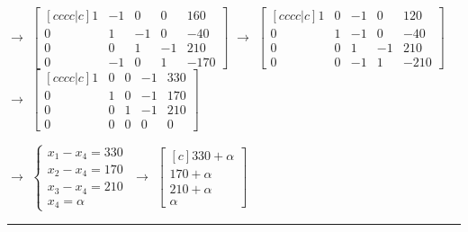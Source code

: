 \begin{example}
$\rightarrow$
$  \begin{bmatrix} [cccc|c]
1 & -1 & 0 & 0 & 160 \\
0 & 1 & -1 & 0 & -40 \\
0 & 0 & 1 & -1 & 210 \\
0 & -1 & 0 & 1 & -170 
  \end{bmatrix} $
$\rightarrow$
$  \begin{bmatrix} [cccc|c]
1 & 0 & -1 & 0 & 120 \\
0 & 1 & -1 & 0 & -40 \\
0 & 0 & 1 & -1 & 210 \\
0 & 0 & -1 & 1 & -210 
 \end{bmatrix} $
 $\rightarrow$
$  \begin{bmatrix} [cccc|c]
1 & 0 & 0 & -1 & 330 \\
0 & 1 & 0 & -1 & 170 \\
0 & 0 & 1 & -1 & 210 \\
0 & 0 & 0 & 0 & 0 
 \end{bmatrix} $

$\rightarrow$
$ \begin{cases}  x_1 -x_4 = 330  \\  x_2 - x_4 = 170  \\  x_3 -x_4  = 210 \\  x_4 = \alpha  \end{cases} $
$\rightarrow$
$\begin{bmatrix} [c]
330 + \alpha \\ 
170 + \alpha \\
210 + \alpha \\
\alpha 
 \end{bmatrix} $ 

\end{example}

















\rule[0.01in]{\textwidth}{0.0025in}





















